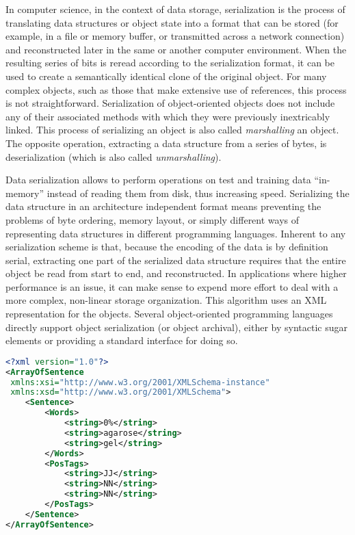 
In computer science, in the context of data storage, serialization is the
process of translating data structures or object state into a format that can
be stored (for example, in a file or memory buffer, or transmitted across a
network connection) and reconstructed later in the same or another computer
environment. When the resulting series of bits is reread according to the
serialization format, it can be used to create a semantically identical clone
of the original object. For many complex objects, such as those that make
extensive use of references, this process is not straightforward. Serialization
of object-oriented objects does not include any of their associated methods
with which they were previously inextricably linked. This process of
serializing an object is also called \textit{marshalling} an object. The
opposite operation, extracting a data structure from a series of bytes, is
deserialization (which is also called \textit{unmarshalling}).

Data serialization allows to perform operations on test and training data
``in-memory'' instead of reading them from disk, thus increasing speed.
Serializing the data structure in an architecture independent format means
preventing the problems of byte ordering, memory layout, or simply different
ways of representing data structures in different programming languages.
Inherent to any serialization scheme is that, because the encoding of the data
is by definition serial, extracting one part of the serialized data structure
requires that the entire object be read from start to end, and reconstructed.
In applications where higher performance is an issue, it can make sense to
expend more effort to deal with a more complex, non-linear storage
organization. This algorithm uses an XML representation for the objects.
Several object-oriented programming languages directly support object
serialization (or object archival), either by syntactic sugar elements or
providing a standard interface for doing so.
\null\vfill

\begin{lstlisting}[language=xml]
<?xml version="1.0"?>
<ArrayOfSentence
 xmlns:xsi="http://www.w3.org/2001/XMLSchema-instance"
 xmlns:xsd="http://www.w3.org/2001/XMLSchema">
    <Sentence>
        <Words>
            <string>0%</string>
            <string>agarose</string>
            <string>gel</string>
        </Words>
        <PosTags>
            <string>JJ</string>
            <string>NN</string>
            <string>NN</string>
        </PosTags>
    </Sentence>
</ArrayOfSentence>
\end{lstlisting}

